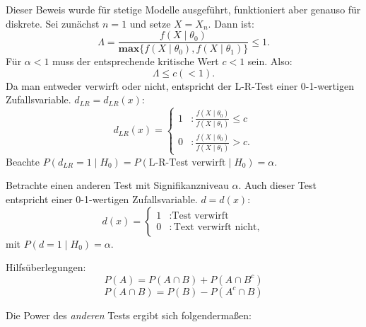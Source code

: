 \documentclass[10pt]{article}
\newcommand{\eqname}[1]{\tag*{#1}}%
\newcommand{\dlr}{d_{LR}}%
\newenvironment{BWS}[1][]
{\begin{Beweis}[frametitle=#1]}{\end{Beweis}}
\begin{document}
	\begin{BWS}[Beweis 2.1.1 (NP-Lemma)]
		Dieser Beweis wurde für stetige Modelle ausgeführt, funktioniert aber genauso für diskrete. 
		Sei zunächst $n=1$ und setze $X = X_n$. 
		Dann ist:
		\begin{equation*}
			\Lambda = \frac{f(X\mid \theta_0)}{\textbf{max}\{f(X\mid \theta_0), f(X \mid \theta_1)\}} \leq 1.
		\end{equation*}
		Für $\alpha < 1$ muss der entsprechende kritische Wert  $c < 1$ sein. Also:
		\begin{equation*}
			\Lambda \leq c (< 1).
		\end{equation*}
		Da man entweder verwirft oder nicht, entspricht der L-R-Test einer 0-1-wertigen Zufallsvariable. $d_{LR} = d_{LR}(x)$:
		\begin{equation*}
			\dlr(x) = \begin{cases}
				1 &: \frac{f(X\mid \theta_0)}{f(X\mid \theta_1)} \leq c\\
				0 &: \frac{f(X\mid \theta_0)}{f(X\mid \theta_1)} > c.
			\end{cases}
		\end{equation*}
		Beachte $P(\dlr=1 \mid H_0) = P(\text{L-R-Test verwirft}\mid H_0) = \alpha$.
		
		Betrachte einen anderen Test mit Signifikanzniveau $\alpha$. Auch dieser Test entspricht einer 0-1-wertigen Zufallsvariable. $d = d(x)$:
		\begin{equation*}
			d(x)= \begin{cases}
				1 &: \text{Test verwirft}\\
				0 &: \text{Text verwirft nicht},
			\end{cases}
		\end{equation*}
		mit $P(d=1\mid H_0) = \alpha$.
		
		Hilfsüberlegungen:
		\begin{equation*}
			P(A) = P(A \cap B) + P(A \cap B^c) \eqname{(1)}
		\end{equation*}
		\begin{equation*}
			P(A \cap B) = P(B) - P(A^c \cap B) \eqname{(2)}
		\end{equation*}
		
		Die Power des \textit{anderen} Tests ergibt sich folgendermaßen:
		

\end{BWS}
\end{document}
